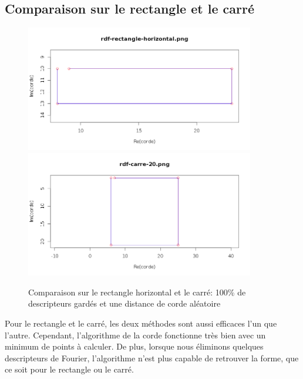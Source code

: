 \documentclass[11pt]{article}
\begin{document}
    \subsection{Comparaison sur le rectangle et le carré}
    \begin{figure}[!h]
      \begin{center}
	\includegraphics[width=10cm]{../resultat/comp_rect.png}\\
	\includegraphics[width=10cm]{../resultat/comp_carre.png}
      \end{center}
      \caption{Comparaison sur le rectangle horizontal et le carré: 100\% de descripteurs gardés et une distance de corde aléatoire}
    \end{figure}
  
  \newpage
  
  Pour le rectangle et le carré, les deux méthodes sont aussi efficaces l'un que l'autre. Cependant, l'algorithme de la corde
  fonctionne très bien avec un minimum de points à calculer.
  De plus, lorsque nous éliminons quelques descripteurs de Fourier, l'algorithme n'est plus capable de
  retrouver la forme, que ce soit pour le rectangle ou le carré.\\
  
\end{document}
